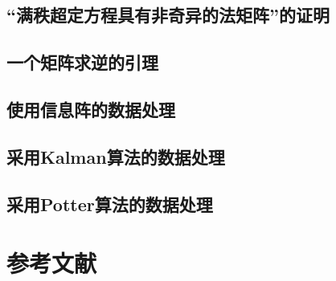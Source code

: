 \documentclass[./book.tex]{subfiles}
\begin{document}
\subsection{“满秩超定方程具有非奇异的法矩阵”的证明}

\subsection{一个矩阵求逆的引理}

\subsection{使用信息阵的数据处理}

\subsection{采用Kalman算法的数据处理}

\subsection{采用Potter算法的数据处理}

\section{参考文献}
\end{document}
